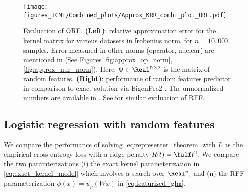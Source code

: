 \documentclass{article}
\def\cite{\citep}
\theoremstyle{plain}
\begin{document}
\begin{figure*}[t]
\texttt{[image: figures\_ICML/Combined\_plots/Approx\_KRR\_combi\_plot\_ORF.pdf]}
\caption{\normalsize\label{fig:ORF_eval}Evaluation of ORF. \textbf{(Left)}: relative approximation error for the kernel matrix for various datasets in frobenius norm, for $n=10,000$ samples. Error measured in other norms (operator, nuclear) are mentioned in  (See Figures \ref{fig:approx_op_norm}, \ref{fig:approx_nuc_norm}). Here, $\Phi\in\Real^{n\times p}$ is the matrix of random features. \textbf{(Right)}: performance of random features predictor in comparison to exact solution via EigenPro2 \cite{ma2019kernel}. The unnormalized numbers are available in . See  for similar evaluation of RFF.}
\end{figure*}

\subsection{Logistic regression with random features}

We compare the performance of solving \cref{eq:representer_theorem} with $L$ as the empirical cross-entropy loss with a ridge penalty $R(t)=\half t^2$. We compare  the two paramterizations (i) the exact kernel parameterization in  \cref{eq:exact_kernel_model} which involves a search over $\Real^n,$ and (ii) the RFF parameterization $\phi(x)=\psi_p(Wx)$ in \cref{eq:featurized_glm}.
\end{document}
